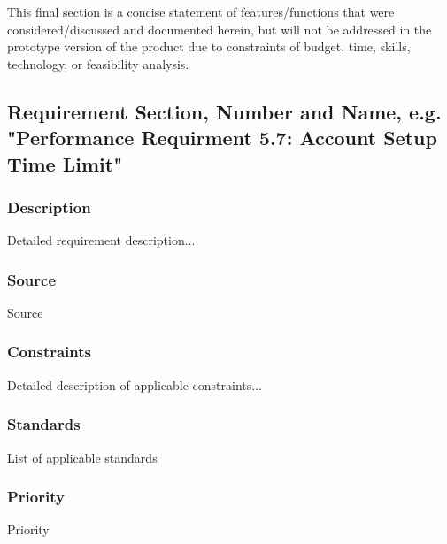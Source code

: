 This final section is a concise statement of features/functions that were considered/discussed and documented herein, but will not be addressed in the prototype version of the product due to constraints of budget, time, skills, technology, or feasibility analysis.

\subsection{Requirement Section, Number and Name, e.g. "Performance Requirment 5.7: Account Setup Time Limit"}
\subsubsection{Description}
Detailed requirement description...
\subsubsection{Source}
Source
\subsubsection{Constraints}
Detailed description of applicable constraints...
\subsubsection{Standards}
List of applicable standards
\subsubsection{Priority}
Priority
